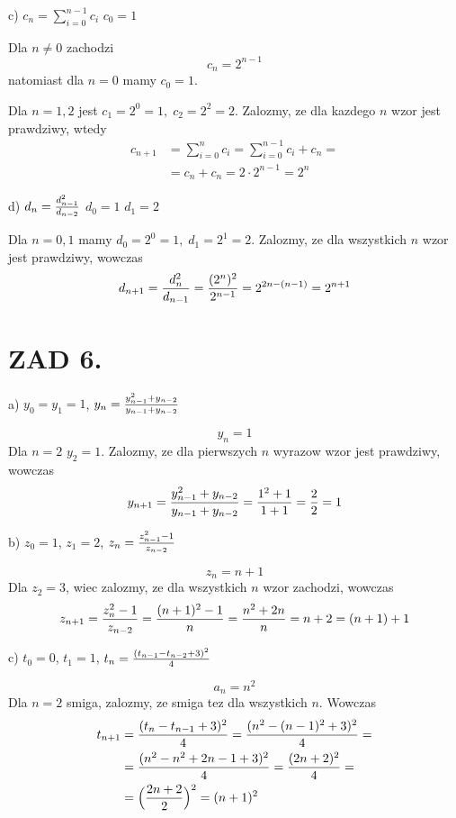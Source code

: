 \documentclass{article}[13pt]
\begin{document}
    \medskip

    c) $c_n=\sum\limits_{i=0}^{n-1}c_i$ $c_0=1$

    Dla $n\neq 0$ zachodzi
    $$c_n=2^{n-1}$$
    natomiast dla $n=0$ mamy $c_0=1$.
    \medskip

    Dla $n=1,2$ jest $c_1=2^0=1,\;c_2=2^2=2$. Zalozmy, ze dla kazdego $n$ wzor jest prawdziwy, wtedy
    \begin{align*}
        c_{n+1}&=\sum\limits_{i=0}^nc_i=\sum\limits_{i=0}^{n-1}c_i+c_n=\\
        &=c_n+c_n=2\cdot 2^{n-1}=2^n
    \end{align*}

    \medskip

    d) $d_n={d_{n-1}^2\over d_{n-2}}$ $d_0=1$ $d_1=2$
    \medskip

    Dla $n=0,1$ mamy $d_0=2^0=1,\;d_1=2^1=2$. Zalozmy, ze dla wszystkich $n$ wzor jest prawdziwy, wowczas
    \begin{align*}
        d_{n+1}={d_n^2\over d_{n-1}}={(2^n)^2\over 2^{n-1}}=2^{2n-(n-1)}=2^{n+1}
    \end{align*}


    \section*{ZAD 6.}

    a) $y_0=y_1=1$, $y_n={y_{n-1}^2+y_{n-2}\over y_{n-1}+y_{n-2}}$

    $$y_n=1$$
    Dla $n=2$ $y_2=1$. Zalozmy, ze dla pierwszych $n$ wyrazow wzor jest prawdziwy, wowczas
    \begin{align*}
        y_{n+1}={y_{n-1}^2+y_{n-2}\over y_{n-1}+y_{n-2}}={1^2+1\over 1+1}=\frac 22=1
    \end{align*}

    \medskip

    b) $z_0=1$, $z_1=2$, $z_n={z_{n-1}^2-1\over z_{n-2}}$

    $$z_n=n+1$$
    Dla $z_2=3$, wiec zalozmy, ze dla wszystkich $n$ wzor zachodzi, wowczas
    \begin{align*}
        z_{n+1}={z_n^2-1\over z_{n-2}}={(n+1)^2-1\over n}={n^2+2n\over n}=n+2=(n+1)+1
    \end{align*}

    \medskip

    c) $t_0=0$, $t_1=1$, $t_n={(t_{n-1}-t_{n-2}+3)^2\over 4}$
    
    $$a_n=n^2$$
    Dla $n=2$ smiga, zalozmy, ze smiga tez dla wszystkich $n$. Wowczas
    \begin{align*}
        t_{n+1}&={(t_n-t_{n-1}+3)^2\over 4}={(n^2-(n-1)^2+3)^2\over 4}=\\
        &={(n^2-n^2+2n-1+3)^2\over 4}={(2n+2)^2\over 4}=\\
        &=\Big({2n+2\over 2}\Big)^2=(n+1)^2
    \end{align*}
\end{document}
